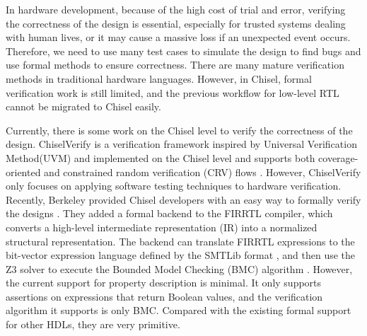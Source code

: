 \documentclass[conference]{IEEEtran}
\theoremstyle{definition}
\begin{document}
In hardware development, because of the high cost of trial and error, verifying the correctness of the design is essential, especially for trusted systems dealing with human lives, or it may cause a massive loss if an unexpected event occurs. Therefore, we need to use many test cases to simulate the design to find bugs and use formal methods to ensure correctness. There are many mature verification methods in traditional hardware languages. However, in Chisel, formal verification work is still limited, and the previous workflow for low-level RTL cannot be migrated to Chisel easily.

Currently, there is some work on the Chisel level to verify the correctness of the design. ChiselVerify is a verification framework inspired by Universal Verification Method(UVM) \cite{mehta2018uvm} and implemented on the Chisel level and supports both coverage-oriented and constrained random verification (CRV) flows \cite{dobis2021chiselverify}. However, ChiselVerify only focuses on applying software testing techniques to hardware verification.
Recently, Berkeley provided Chisel developers with an easy way to formally verify the designs \cite{dobis2021open}. They added a formal backend to the FIRRTL compiler, which converts a high-level intermediate representation (IR) into a normalized structural representation. The backend can translate FIRRTL expressions to the bit-vector expression language defined by the SMTLib format \cite{barrett2010smt}, and then use the Z3 solver \cite{moura2008z3} to execute the Bounded Model Checking (BMC) algorithm \cite{biere2009bounded}.
However, the current support for property description is minimal. It only supports assertions on expressions that return Boolean values, and the verification algorithm it supports is only BMC. Compared with the existing formal support for other HDLs, they are very primitive.
\end{document}
